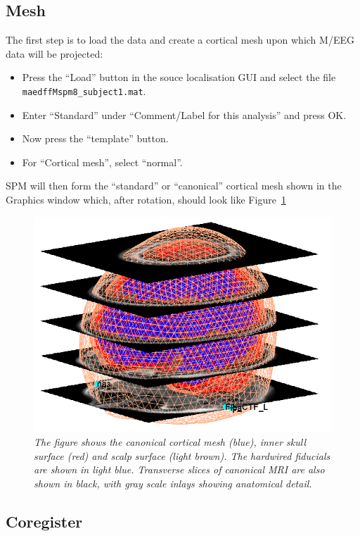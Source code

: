 \subsection{Mesh}
The first step is to load the data and create a cortical mesh upon which M/EEG data will be projected:
\begin{itemize}
\item{Press the ``Load'' button in the souce localisation GUI and select the file \texttt{maedffMspm8\_subject1.mat}.}
\item{Enter ``Standard'' under ``Comment/Label for this analysis'' and press OK.}
\item{Now press the ``template'' button.}
\item{For ``Cortical mesh'', select ``normal''.}
\end{itemize}
SPM will then form the ``standard'' or ``canonical'' cortical mesh shown in the Graphics window which, after rotation, should look like Figure~\ref{mesh}
\begin{figure}
\begin{center}
\includegraphics[width=120mm]{mmn/mesh}
\caption{\em The figure shows the canonical cortical mesh (blue), inner skull surface (red) and scalp surface (light brown). The hardwired fiducials are shown in light blue. Transverse slices of canonical MRI are also shown in black, with gray scale inlays showing anatomical detail.
\label{mesh}}
\end{center}
\end{figure}

\subsection{Coregister}

